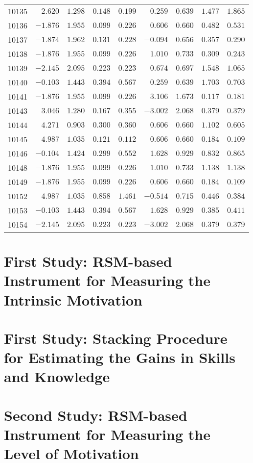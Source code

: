 \begin{landscape}
{\begin{longtable}{lrrrrrrrr}
10135&$ 2.620$&$1.298$&$0.148$&$0.199$&$ 0.259$&$0.639$&$1.477$&$1.865$\tabularnewline
10136&$-1.876$&$1.955$&$0.099$&$0.226$&$ 0.606$&$0.660$&$0.482$&$0.531$\tabularnewline
10137&$-1.874$&$1.962$&$0.131$&$0.228$&$-0.094$&$0.656$&$0.357$&$0.290$\tabularnewline
10138&$-1.876$&$1.955$&$0.099$&$0.226$&$ 1.010$&$0.733$&$0.309$&$0.243$\tabularnewline
10139&$-2.145$&$2.095$&$0.223$&$0.223$&$ 0.674$&$0.697$&$1.548$&$1.065$\tabularnewline
10140&$-0.103$&$1.443$&$0.394$&$0.567$&$ 0.259$&$0.639$&$1.703$&$0.703$\tabularnewline
10141&$-1.876$&$1.955$&$0.099$&$0.226$&$ 3.106$&$1.673$&$0.117$&$0.181$\tabularnewline
10143&$ 3.046$&$1.280$&$0.167$&$0.355$&$-3.002$&$2.068$&$0.379$&$0.379$\tabularnewline
10144&$ 4.271$&$0.903$&$0.300$&$0.360$&$ 0.606$&$0.660$&$1.102$&$0.605$\tabularnewline
10145&$ 4.987$&$1.035$&$0.121$&$0.112$&$ 0.606$&$0.660$&$0.184$&$0.109$\tabularnewline
10146&$-0.104$&$1.424$&$0.299$&$0.552$&$ 1.628$&$0.929$&$0.832$&$0.865$\tabularnewline
10148&$-1.876$&$1.955$&$0.099$&$0.226$&$ 1.010$&$0.733$&$1.138$&$1.138$\tabularnewline
10149&$-1.876$&$1.955$&$0.099$&$0.226$&$ 0.606$&$0.660$&$0.184$&$0.109$\tabularnewline
10152&$ 4.987$&$1.035$&$0.858$&$1.461$&$-0.514$&$0.715$&$0.446$&$0.384$\tabularnewline
10153&$-0.103$&$1.443$&$0.394$&$0.567$&$ 1.628$&$0.929$&$0.385$&$0.411$\tabularnewline
10154&$-2.145$&$2.095$&$0.223$&$0.223$&$-3.002$&$2.068$&$0.379$&$0.379$\tabularnewline
\hline
\end{longtable}}\end{landscape}


\section{First Study: RSM-based Instrument for Measuring the Intrinsic Motivation}
\label{sec:irt-motivation-first-study}

\section{First Study: Stacking Procedure for Estimating the Gains in Skills and Knowledge}
\label{sec:irt-learning-outcomes-first-study}

\section{Second Study: RSM-based Instrument for Measuring the Level of Motivation}
\label{sec:irt-motivation-second-study}

